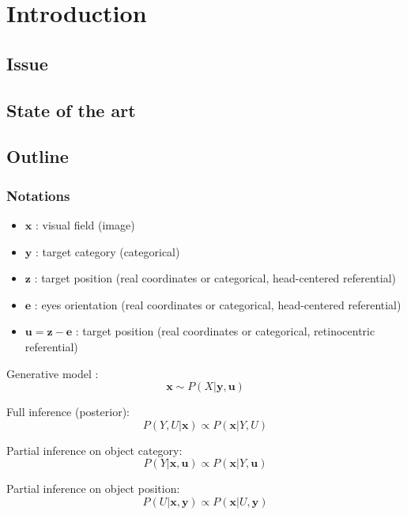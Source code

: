 \section{Introduction}

\subsection{Issue}

\subsection{State of the art}

\subsection{Outline}

\subsubsection{Notations}
\begin{itemize}
	\item $\boldsymbol{x}$ : visual field (image)
	\item $\boldsymbol{y}$ : target category (categorical)
	\item $\boldsymbol{z}$ : target position (real coordinates or categorical, head-centered referential)
	\item $\boldsymbol{e}$ : eyes orientation (real coordinates or categorical, head-centered referential)
	\item $\boldsymbol{u} = \boldsymbol{z} - \boldsymbol{e}$ : target position (real coordinates or categorical, retinocentric referential)

\end{itemize}

Generative model :
$$ \boldsymbol{x} \sim P(X|\boldsymbol{y}, \boldsymbol{u}) $$

Full inference (posterior):
$$ P(Y, U|\boldsymbol{x}) \propto  P(\boldsymbol{x}|Y, U) $$


Partial inference on object category:
$$ P(Y|\boldsymbol{x}, \boldsymbol{u}) \propto  P(\boldsymbol{x}|Y, \boldsymbol{u}) $$

Partial inference on object position:
$$ P(U|\boldsymbol{x}, \boldsymbol{y}) \propto  P(\boldsymbol{x}|U, \boldsymbol{y}) $$

